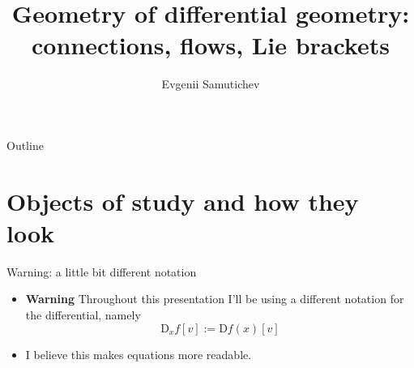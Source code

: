 \documentclass{beamer}
\title{Geometry of differential \textbf{geometry}: connections, flows, Lie brackets}
\author{Evgenii Samutichev}
\begin{document}
\maketitle

\begin{frame}{Outline}
    \small 
    \tableofcontents
\end{frame}

\section{Objects of study and how they look}
\begin{frame}{Warning: a little bit different notation}
    \begin{itemize}
        \item \textbf{Warning} Throughout this presentation I'll be using a different notation for the differential, namely 
        \begin{equation}
            \text{D}_x f[v] := \text{D}f(x)[v]
        \end{equation}
        \item I believe this makes equations more readable.
    \end{itemize}
\end{frame}
\end{document}

